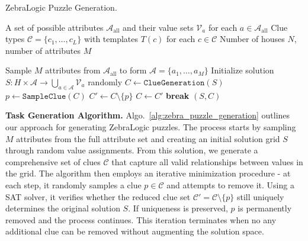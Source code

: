 \begin{algorithm}[t]
    \caption{ZebraLogic Puzzle Generation.}
    \label{alg:zebra_puzzle_generation}
    \begin{algorithmic}[1]
    \small 
    \Require A set of possible attributes $\mathcal{A}_{\text{all}}$ and their value sets $\mathcal{V}_a$ for each $a \in \mathcal{A}_{\text{all}}$
    \Require Clue types $\mathcal{C} = \{c_1, \ldots, c_L\}$ with templates $T(c)$ for each $c \in \mathcal{C}$
    \Require Number of houses $N$, number of attributes $M$
    
    \State Sample $M$ attributes from $\mathcal{A}_{\text{all}}$ to form $\mathcal{A} = \{a_1, \ldots, a_M\}$
    \State Initialize solution $S: H \times \mathcal{A} \rightarrow \bigcup_{a \in \mathcal{A}} \mathcal{V}_a$ randomly
    \State $C \gets \texttt{ClueGeneration}(S)$ 
        \State $p \gets \texttt{SampleClue}(C)$ 
        \State $C' \gets C \setminus \{p\}$
            \State $C \gets C'$ 
            \State \textbf{break} 
        \EndIf
    \EndWhile
    \State \Return $(S, C)$ 
    \end{algorithmic}
\end{algorithm}




\textbf{Task Generation Algorithm.}
Algo.~\ref{alg:zebra_puzzle_generation} outlines our approach for generating ZebraLogic puzzles. 
The process starts by sampling $M$ attributes from the full attribute set and creating an initial solution grid $S$ through random value assignments. 
From this solution, we generate a comprehensive set of clues $\mathcal{C}$ that capture all valid relationships between values in the grid. 
The algorithm then employs an iterative minimization procedure - at each step, it randomly samples a clue $p \in \mathcal{C}$ and attempts to remove it. Using a SAT solver, it verifies whether the reduced clue set $\mathcal{C}' = \mathcal{C} \setminus \{p\}$ still uniquely determines the original solution $S$. If uniqueness is preserved, $p$ is permanently removed and the process continues. This iteration terminates when no any additional clue can be removed without augmenting the solution space.

